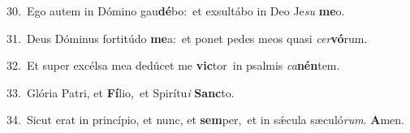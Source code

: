 {\numbfont\textcolor{\numbcolor}{30.}}~Ego autem in Dómino gau\-\textbf{dé}\-bo:~\star et exsultábo in Deo Je\textit{su} \textbf{me}\-o.\par
{\numbfont\textcolor{\numbcolor}{31.}}~Deus Dóminus fortitúdo \textbf{me}\-a:~\star et ponet pedes meos quasi \textit{cer}\-\textbf{vó}rum.\par
{\numbfont\textcolor{\numbcolor}{32.}}~Et super excélsa mea dedúcet me \textbf{vic}\-tor~\star in psalmis \textit{ca}\-\textbf{nén}tem.\par
{\numbfont\textcolor{\numbcolor}{33.}}~Glória Patri, et \textbf{Fí}\-lio,~\star et Spirítu\textit{i} \textbf{Sanc}\-to.\par
{\numbfont\textcolor{\numbcolor}{34.}}~Sicut erat in princípio, et nunc, et \textbf{sem}\-per,~\star et in sǽcula sæculó\-\textit{rum}\-. \textbf{A}\-men.\par

